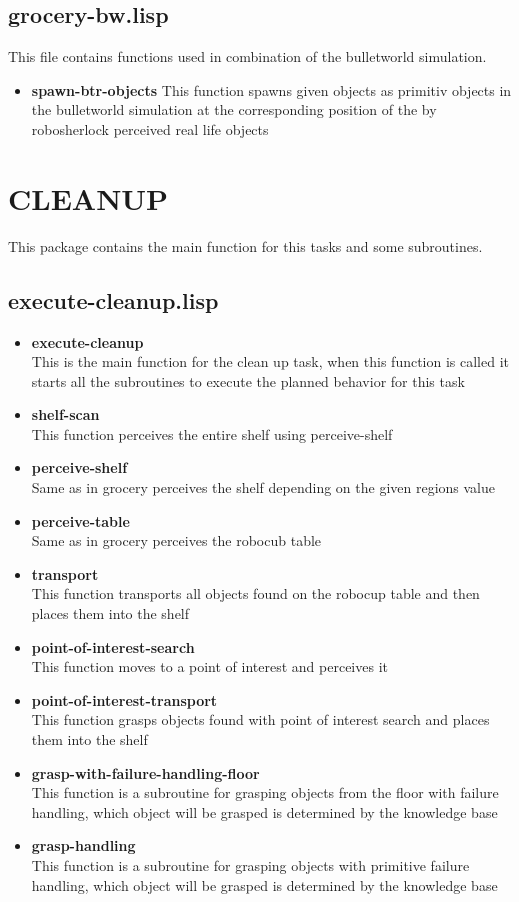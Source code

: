 \documentclass[main.tex]{subfiles}
\begin{document}
		\subsection{grocery-bw.lisp}
		This file contains functions used in combination of the bulletworld simulation.
		\begin{itemize}
			\item \textbf{spawn-btr-objects}
			This function spawns given objects as primitiv objects in the bulletworld simulation at the corresponding position of the by robosherlock perceived real life objects 
		\end{itemize}
	  	
	  	\section{CLEANUP}
	  	This package contains the main function for this tasks and some subroutines.
	  	\subsection{execute-cleanup.lisp}
	  	\begin{itemize}
			\item \textbf{execute-cleanup} \\
			This is the main function for the clean up task, when this function is called it starts all the subroutines to execute the planned behavior for this task
			\item \textbf{shelf-scan} \\
			This function perceives the entire shelf using perceive-shelf
			\item \textbf{perceive-shelf} \\
			Same as in grocery perceives the shelf depending on the given regions value
			\item \textbf{perceive-table} \\
			Same as in grocery perceives the robocub table
			\item \textbf{transport} \\
            This function transports all objects found on the robocup table and then places them into the shelf
			\item \textbf{point-of-interest-search} \\
			This function moves to a point of interest and perceives it 
			\item \textbf{point-of-interest-transport} \\
			This function grasps objects found with point of interest search and places them into the shelf
			\item \textbf{grasp-with-failure-handling-floor} \\
			This function is a subroutine for grasping objects from the floor with failure handling, which object will be grasped is determined by the knowledge base
			\item \textbf{grasp-handling}\\
			This function is a subroutine for grasping objects with primitive failure handling, which object will be grasped is determined by the knowledge base
		\end{itemize}
\end{document}

